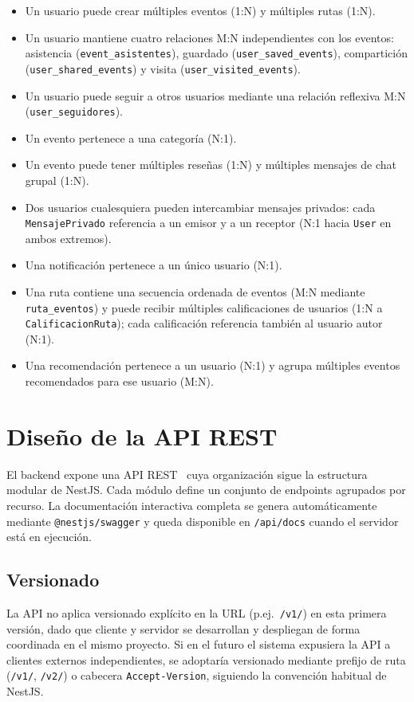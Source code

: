 \begin{itemize}
    \item Un usuario puede crear múltiples eventos (1:N) y múltiples rutas (1:N).
    \item Un usuario mantiene cuatro relaciones M:N independientes con los eventos: asistencia (\texttt{event\_asistentes}), guardado (\texttt{user\_saved\_events}), compartición (\texttt{user\_shared\_events}) y visita (\texttt{user\_visited\_events}).
    \item Un usuario puede seguir a otros usuarios mediante una relación reflexiva M:N (\texttt{user\_seguidores}).
    \item Un evento pertenece a una categoría (N:1).
    \item Un evento puede tener múltiples reseñas (1:N) y múltiples mensajes de chat grupal (1:N).
    \item Dos usuarios cualesquiera pueden intercambiar mensajes privados: cada \texttt{MensajePrivado} referencia a un emisor y a un receptor (N:1 hacia \texttt{User} en ambos extremos).
    \item Una notificación pertenece a un único usuario (N:1).
    \item Una ruta contiene una secuencia ordenada de eventos (M:N mediante \texttt{ruta\_eventos}) y puede recibir múltiples calificaciones de usuarios (1:N a \texttt{CalificacionRuta}); cada calificación referencia también al usuario autor (N:1).
    \item Una recomendación pertenece a un usuario (N:1) y agrupa múltiples eventos recomendados para ese usuario (M:N).
\end{itemize}

\section{Diseño de la API REST}

El backend expone una API REST~\cite{fielding2000rest} cuya organización sigue la estructura modular de NestJS. Cada módulo define un conjunto de endpoints agrupados por recurso. La documentación interactiva completa se genera automáticamente mediante \texttt{@nestjs/swagger} y queda disponible en \texttt{/api/docs} cuando el servidor está en ejecución.

\subsection{Versionado}

La API no aplica versionado explícito en la URL (p.ej.\ \texttt{/v1/}) en esta primera versión, dado que cliente y servidor se desarrollan y despliegan de forma coordinada en el mismo proyecto. Si en el futuro el sistema expusiera la API a clientes externos independientes, se adoptaría versionado mediante prefijo de ruta (\texttt{/v1/}, \texttt{/v2/}) o cabecera \texttt{Accept-Version}, siguiendo la convención habitual de NestJS.

